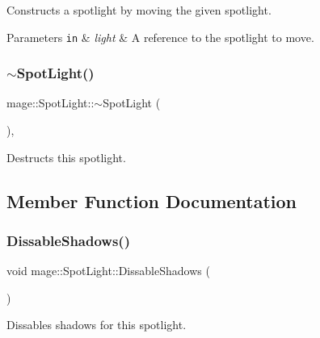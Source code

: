 Constructs a spotlight by moving the given spotlight.


\begin{DoxyParams}[1]{Parameters}
\mbox{\tt in}  & {\em light} & A reference to the spotlight to move. \\
\hline
\end{DoxyParams}
\hypertarget{classmage_1_1_spot_light_aeeaba91c6448102ac6a23587c5366808}{}\label{classmage_1_1_spot_light_aeeaba91c6448102ac6a23587c5366808} 
\subsubsection{\texorpdfstring{$\sim$\+Spot\+Light()}{~SpotLight()}}
{\footnotesize\ttfamily mage\+::\+Spot\+Light\+::$\sim$\+Spot\+Light (\begin{DoxyParamCaption}{ }\end{DoxyParamCaption})\hspace{0.3cm}{\ttfamily [virtual]}, {\ttfamily [default]}}

Destructs this spotlight. 

\subsection{Member Function Documentation}
\hypertarget{classmage_1_1_spot_light_ae43668c2ae4c041b8abf822e15ab2185}{}\label{classmage_1_1_spot_light_ae43668c2ae4c041b8abf822e15ab2185} 
\subsubsection{\texorpdfstring{Dissable\+Shadows()}{DissableShadows()}}
{\footnotesize\ttfamily void mage\+::\+Spot\+Light\+::\+Dissable\+Shadows (\begin{DoxyParamCaption}{ }\end{DoxyParamCaption})\hspace{0.3cm}{\ttfamily [noexcept]}}

Dissables shadows for this spotlight. \hypertarget{classmage_1_1_spot_light_a51694c316560929e6ae49c019d3dc763}{}\label{classmage_1_1_spot_light_a51694c316560929e6ae49c019d3dc763} 
